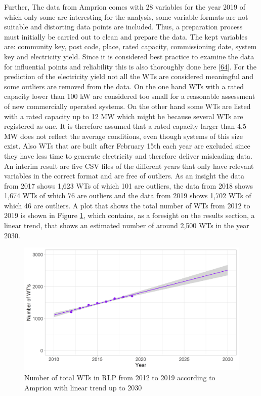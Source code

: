\documentclass[a4paper,11pt]{article}
\begin{document}
Further, The data from Amprion comes with 28 variables for the year 2019 of which only some are interesting for the analysis, some variable formats are not suitable and distorting data points are included. Thus, a preparation process must initially be carried out to clean and prepare the data. The kept variables are: community key, post code, place, rated capacity, commissioning date, system key and electricity yield. Since it is considered best practice to examine the data for influential points and reliability this is also thoroughly done here {[}\protect\hyperlink{ref-JasonW.Osborne.2013}{64}{]}. For the prediction of the electricity yield not all the WTs are considered meaningful and some outliers are removed from the data. On the one hand WTs with a rated capacity lower than 100 kW are considered too small for a reasonable assessment of new commercially operated systems. On the other hand some WTs are listed with a rated capacity up to 12 MW which might be because several WTs are registered as one. It is therefore assumed that a rated capacity larger than 4.5 MW does not reflect the average conditions, even though systems of this size exist. Also WTs that are built after February 15th each year are excluded since they have less time to generate electricity and therefore deliver misleading data. An interim result are five CSV files of the different years that only have relevant variables in the correct format and are free of outliers. As an insight the data from 2017 shows 1,623 WTs of which 101 are outliers, the data from 2018 shows 1,674 WTs of which 76 are outliers and the data from 2019 shows 1,702 WTs of which 46 are outliers. A plot that shows the total number of WTs from 2012 to 2019 is shown in Figure \ref{fig:yearswts}, which contains, as a foresight on the results section, a linear trend, that shows an estimated number of around 2,500 WTs in the year 2030.
\begin{figure}[H]

{\centering \includegraphics[width=1\linewidth]{data/Amprion/results_of_analysis/year_wts} 

}

\caption{Number of total WTs in RLP from 2012 to 2019 according to Amprion with linear trend up to 2030}\label{fig:yearswts}
\end{figure}
\end{document}
